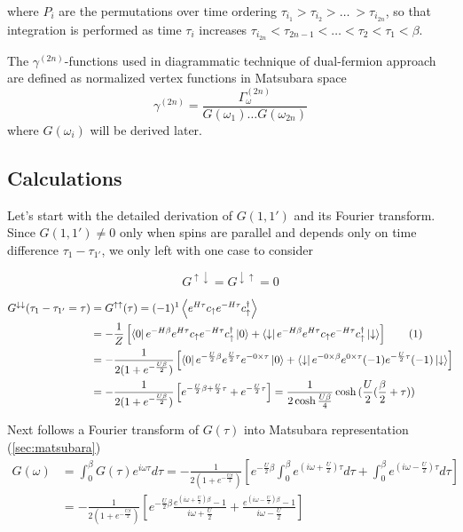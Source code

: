 where $P_i$ are the permutations over time ordering $\tau_{i_1}>\tau_{i_2}>\dots\ >\tau_{i_{2n}}$,
 so that integration is performed as time $\tau_i$ increases $\tau_{i_{2n}}<\tau_{2n-1}<\dots<\tau_2<\tau_1<\beta$.

The $\gamma^{(2n)}$-functions used in diagrammatic technique of dual-fermion approach are defined as normalized vertex functions in Matsubara space
\begin{equation} \gamma^{(2n)} = \frac{\Gamma_\omega^{(2n)}}{G(\omega_1)\dots G(\omega_{2n})} \end{equation}
where $G(\omega_i)$ will be derived later.

\subsection{Calculations}
Let's start with the detailed derivation of $G(1,1')$ and its Fourier transform.
Since $G(1,1')\neq0$ only when spins are parallel and depends only on time difference $\tau_1-\tau_{1'}$, we only left with one case to consider

\begin{equation}
 G^{\uparrow\downarrow} = G^{\downarrow\uparrow} = 0
\end{equation}

\begin{align*}
 \label{Gamma2}
 \stepcounter{equation}
 G^{\downarrow\downarrow}(\tau_1-\tau_{1'}=\tau) & = G^{\uparrow\uparrow}(\tau) = (-1)^1\left\langle e^{H\tau} c_\uparrow e^{-H\tau} c_\uparrow^\dagger\right\rangle \\
  & = 
  -\frac{1}{Z}\left[
    \bra{0}e^{-H\beta}e^{H\tau}c_\uparrow e^{-H\tau} c_\uparrow^\dagger\ket{0} +
    \bra{\downarrow}e^{-H\beta}e^{H\tau}c_\uparrow e^{-H\tau} c_\uparrow^\dagger\ket{\downarrow}
  \right] \tag{\theequation} \\
  & = -\frac{1}{2(1+e^{-\frac{U\beta}{2}})}\left[ 
    \bra{0}e^{-\frac{U}{2}\beta}e^{\frac{U}{2}\tau}e^{-0\times\tau}\ket{0} +
    \bra{\downarrow}e^{-0\times\beta}e^{0\times\tau}(-1)e^{-\frac{U}{2}\tau}(-1)\ket{\downarrow}
  \right] \\
  & = -\frac{1}{2(1+e^{-\frac{U\beta}{2}})}\left[
    e^{-\frac{U}{2}\beta+\frac{U}{2}\tau} + e^{-\frac{U}{2}\tau}
  \right] = \frac{1}{2\cosh{\frac{U\beta}{4}}}\cosh{(\frac{U}{2}(\frac{\beta}{2}+\tau))}
\end{align*}

Next follows a Fourier transform of $G(\tau)$ into Matsubara representation (\autoref{sec:matsubara}) 
\begin{equation}\begin{aligned}
 G(\omega) & = \int_0^\beta G(\tau) e^{i\omega\tau} d\tau
  = -\frac{1}{2(1+e^{-\frac{U\beta}{2}})}\left[ 
    e^{-\frac{U}{2}\beta}\int_0^\beta  e^{(i\omega+\frac{U}{2})\tau} d\tau + \int_0^\beta  e^{(i\omega-\frac{U}{2})\tau} d\tau
  \right] \\
 & = -\frac{1}{2(1+e^{-\frac{U\beta}{2}})}\left[
    e^{-\frac{U}{2}\beta} \frac{e^{(i\omega+\frac{U}{2})\beta}-1}{i\omega+\frac{U}{2}} + \frac{e^{(i\omega-\frac{U}{2})\beta}-1}{i\omega-\frac{U}{2}}
  \right]
\end{aligned}\end{equation}

